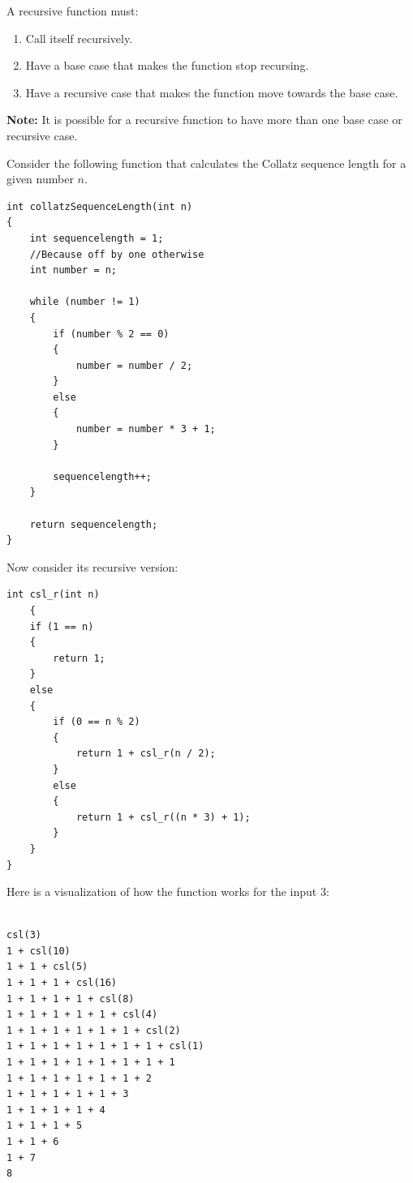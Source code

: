 \documentclass[12pt]{article}
\begin{document}
\noindent A recursive function must:

\begin{enumerate}
    \item Call itself recursively.
    \item Have a base case that makes the function stop recursing.
    \item Have a recursive case that makes the function move towards the base case.
\end{enumerate}

\noindent \textbf{Note:} It is possible for a recursive function to have more than one base case or recursive case. \\

\newpage

\noindent Consider the following function that calculates the Collatz sequence length for a given number $n$.

\begin{verbatim}
int collatzSequenceLength(int n)
{
    int sequencelength = 1; 
    //Because off by one otherwise
    int number = n;

    while (number != 1)
    {
        if (number % 2 == 0)
        {
            number = number / 2;
        }
        else
        {
            number = number * 3 + 1;
        }
        
        sequencelength++;
    }

    return sequencelength;
}
\end{verbatim}

\newpage
\noindent Now consider its recursive version:
\begin{verbatim}
int csl_r(int n)
    {
    if (1 == n)
    {
        return 1;
    }
    else
    {
        if (0 == n % 2)
        {
            return 1 + csl_r(n / 2);
        }
        else
        {
            return 1 + csl_r((n * 3) + 1);
        }
    }
}
\end{verbatim}

\newpage
\noindent Here is a visualization of how the function works for the input $3$:

\begin{verbatim}

csl(3)
1 + csl(10)
1 + 1 + csl(5)
1 + 1 + 1 + csl(16)
1 + 1 + 1 + 1 + csl(8)
1 + 1 + 1 + 1 + 1 + csl(4)
1 + 1 + 1 + 1 + 1 + 1 + csl(2)
1 + 1 + 1 + 1 + 1 + 1 + 1 + csl(1)
1 + 1 + 1 + 1 + 1 + 1 + 1 + 1
1 + 1 + 1 + 1 + 1 + 1 + 2
1 + 1 + 1 + 1 + 1 + 3
1 + 1 + 1 + 1 + 4
1 + 1 + 1 + 5
1 + 1 + 6
1 + 7
8

\end{verbatim}
\end{document}
